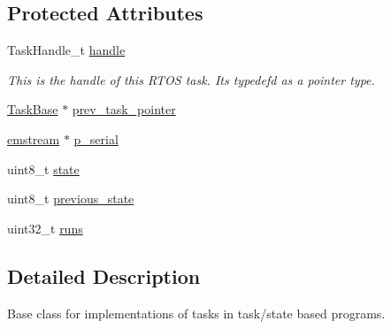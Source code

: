 \subsection*{Protected Attributes}
\begin{DoxyCompactItemize}
\item 
\mbox{\label{class_task_base_abd349e5f74bd10d1288459b66858ea26}} 
Task\+Handle\+\_\+t \mbox{\hyperlink{class_task_base_abd349e5f74bd10d1288459b66858ea26}{handle}}
\begin{DoxyCompactList}\small\item\em This is the handle of this R\+T\+OS task. It\textquotesingle{}s typedef\textquotesingle{}d as a pointer type. \end{DoxyCompactList}\item 
\mbox{\hyperlink{class_task_base}{Task\+Base}} $\ast$ \mbox{\hyperlink{class_task_base_a4f8adbe534975ada5ffb46fa403ef07f}{prev\+\_\+task\+\_\+pointer}}
\item 
\mbox{\hyperlink{classemstream}{emstream}} $\ast$ \mbox{\hyperlink{class_task_base_a5299f7fa222eb0ddac3b77e667170fd7}{p\+\_\+serial}}
\item 
uint8\+\_\+t \mbox{\hyperlink{class_task_base_aab6866bbd5d036810829ccc7cd3ab0e8}{state}}
\item 
uint8\+\_\+t \mbox{\hyperlink{class_task_base_a9736ccdb46487c91c49bdbf2c24b52d3}{previous\+\_\+state}}
\item 
uint32\+\_\+t \mbox{\hyperlink{class_task_base_ab5503939e17359f0f3f9249f622df389}{runs}}
\end{DoxyCompactItemize}


\subsection{Detailed Description}
Base class for implementations of tasks in task/state based programs. 

